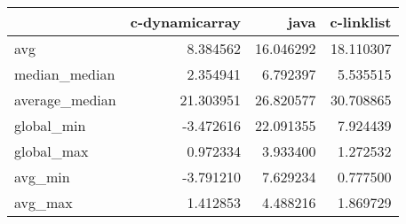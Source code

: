 \begin{tabular}{lrrr}
\toprule
{} &  c-dynamicarray &       java &  c-linklist \\
\midrule
avg            &        8.384562 &  16.046292 &   18.110307 \\
median\_median  &        2.354941 &   6.792397 &    5.535515 \\
average\_median &       21.303951 &  26.820577 &   30.708865 \\
global\_min     &       -3.472616 &  22.091355 &    7.924439 \\
global\_max     &        0.972334 &   3.933400 &    1.272532 \\
avg\_min        &       -3.791210 &   7.629234 &    0.777500 \\
avg\_max        &        1.412853 &   4.488216 &    1.869729 \\
\bottomrule
\end{tabular}
